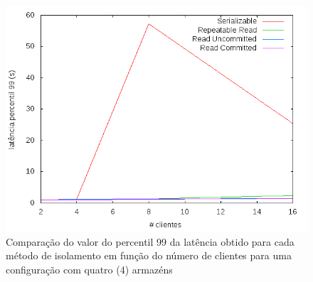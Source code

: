\begin{figure}[!h]
\centering
\includegraphics[scale=.5]{img/questao-1/diff-lat-pct99-4-arm}
\caption{Comparação do valor do percentil 99 da latência obtido para cada método de isolamento em função do número de clientes para uma configuração com quatro (4) armazéns}
\end{figure}
